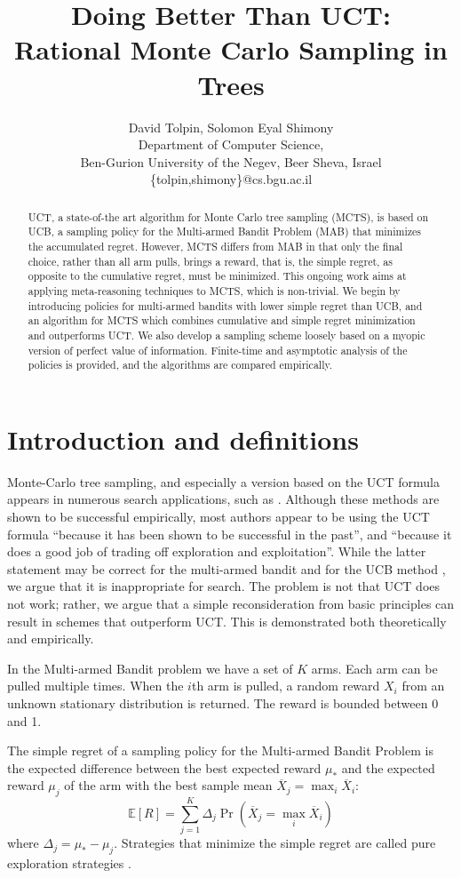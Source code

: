 \documentclass{article}
\title{Doing Better Than UCT: \\ Rational Monte Carlo Sampling in Trees}
\author {David Tolpin, Solomon Eyal Shimony \\
Department of Computer Science, \\
Ben-Gurion University of the Negev, Beer Sheva, Israel \\
\{tolpin,shimony\}@cs.bgu.ac.il}
\newcommand {\IE} {\ensuremath {\mathbb{E}}}
\begin{document}
\maketitle

\begin{abstract}
UCT, a state-of-the art algorithm for Monte Carlo tree sampling
(MCTS), is based on UCB, a sampling policy for the Multi-armed Bandit
Problem (MAB) that minimizes the accumulated regret. However, MCTS
differs from MAB in that only the final choice, rather than all arm
pulls, brings a reward, that is, the simple regret, as opposite to the
cumulative regret, must be minimized. This ongoing work aims at applying
meta-reasoning techniques to MCTS, which is non-trivial.
We begin by introducing policies for
multi-armed bandits with lower simple regret than UCB, and an
algorithm for MCTS which combines cumulative and simple regret
minimization and outperforms UCT. We also develop a sampling scheme loosely based
on a myopic version of perfect value of information.
Finite-time and asymptotic analysis of
the policies is provided, and the algorithms are compared empirically.
\end{abstract}


\section{Introduction and definitions}

Monte-Carlo tree sampling, and especially a version based on the
UCT formula \cite{Kocsis.uct} appears in numerous search applications,
such as \cite{Eyerich.ctp}. Although these methods are shown to be successful empirically,
most authors appear to be using the UCT formula ``because it has been shown
to be successful in the past'', and ``because it does a good job of
trading off exploration and exploitation''. While the latter statement may be
correct for the multi-armed bandit and for the UCB method \cite{Auer.ucb},
we argue that it is inappropriate for search. The problem is not that
UCT does not work; rather, we argue that a simple reconsideration from basic
principles can result in schemes that outperform UCT. This is demonstrated both
theoretically and empirically.

In the Multi-armed Bandit problem we have a set of $K$ arms. Each arm can be pulled
multiple times. When the $i$th arm is pulled, a random reward $X_i$
from an unknown stationary distribution is returned.  The reward is 
bounded between 0 and 1. 

The simple regret of a sampling policy for the Multi-armed Bandit
Problem is the expected difference between the best expected reward
$\mu_*$ and the expected reward $\mu_j$ of the arm with the best sample mean
$\overline X_j=\max_i\overline X_i$:
\begin{equation}
\label{eq:simple-regret}
\IE[R]=\sum_{j=1}^K\Delta_j\Pr(\overline X_j=\max_i\overline X_i)
\end{equation}
where $\Delta_j=\mu_*-\mu_j$.
Strategies that minimize the simple regret are called pure exploration
strategies \cite{Bubeck.pure}.
\end{document}
